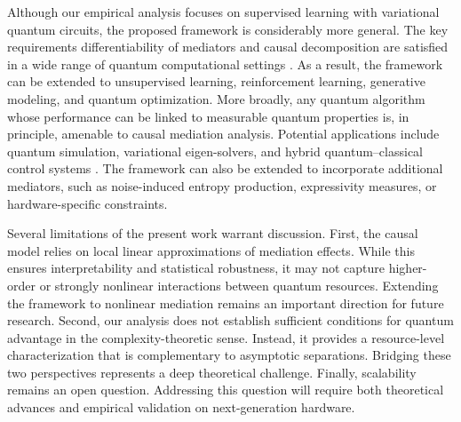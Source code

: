 \documentclass[
    reprint,
    amsmath, amssymb,
    aps,
    floatfix,
    nofootinbib
]{revtex4-1}
\begin{document}
Although our empirical analysis focuses on supervised learning with variational quantum circuits, the proposed framework is considerably more general. The key requirements differentiability of mediators and causal decomposition are satisfied in a wide range of quantum computational settings \cite{jerbi2023quantum}. As a result, the framework can be extended to unsupervised learning, reinforcement learning, generative modeling, and quantum optimization. More broadly, any quantum algorithm whose performance can be linked to measurable quantum properties is, in principle, amenable to causal mediation analysis. Potential applications include quantum simulation, variational eigen-solvers, and hybrid quantum–classical control systems \cite{cerezo2022challenges}. The framework can also be extended to incorporate additional mediators, such as noise-induced entropy production, expressivity measures, or hardware-specific constraints.

Several limitations of the present work warrant discussion. First, the causal model relies on local linear approximations of mediation effects. While this ensures interpretability and statistical robustness, it may not capture higher-order or strongly nonlinear interactions between quantum resources. Extending the framework to nonlinear mediation remains an important direction for future research. Second, our analysis does not establish sufficient conditions for quantum advantage in the complexity-theoretic sense. Instead, it provides a resource-level characterization that is complementary to asymptotic separations. Bridging these two perspectives represents a deep theoretical challenge. Finally, scalability remains an open question.  Addressing this question will require both theoretical advances and empirical validation on next-generation hardware.
\end{document}

